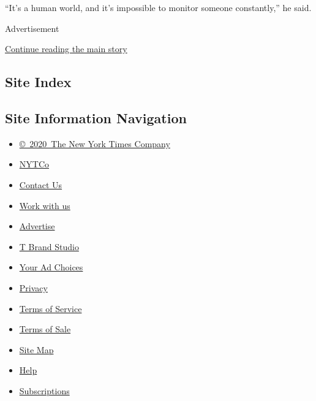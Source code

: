 ``It's a human world, and it's impossible to monitor someone
constantly,'' he said.

Advertisement

\protect\hyperlink{after-bottom}{Continue reading the main story}

\hypertarget{site-index}{%
\subsection{Site Index}\label{site-index}}

\hypertarget{site-information-navigation}{%
\subsection{Site Information
Navigation}\label{site-information-navigation}}

\begin{itemize}
\tightlist
\item
  \href{https://help.nytimes.com/hc/en-us/articles/115014792127-Copyright-notice}{©~2020~The
  New York Times Company}
\end{itemize}

\begin{itemize}
\tightlist
\item
  \href{https://www.nytco.com/}{NYTCo}
\item
  \href{https://help.nytimes.com/hc/en-us/articles/115015385887-Contact-Us}{Contact
  Us}
\item
  \href{https://www.nytco.com/careers/}{Work with us}
\item
  \href{https://nytmediakit.com/}{Advertise}
\item
  \href{http://www.tbrandstudio.com/}{T Brand Studio}
\item
  \href{https://www.nytimes.com/privacy/cookie-policy\#how-do-i-manage-trackers}{Your
  Ad Choices}
\item
  \href{https://www.nytimes.com/privacy}{Privacy}
\item
  \href{https://help.nytimes.com/hc/en-us/articles/115014893428-Terms-of-service}{Terms
  of Service}
\item
  \href{https://help.nytimes.com/hc/en-us/articles/115014893968-Terms-of-sale}{Terms
  of Sale}
\item
  \href{https://spiderbites.nytimes.com}{Site Map}
\item
  \href{https://help.nytimes.com/hc/en-us}{Help}
\item
  \href{https://www.nytimes.com/subscription?campaignId=37WXW}{Subscriptions}
\end{itemize}
